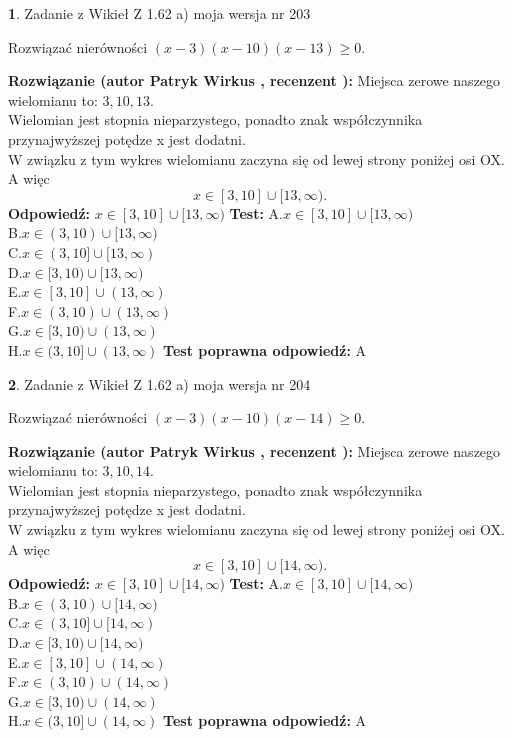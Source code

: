 \documentclass[12pt, a4paper]{article}
\theoremstyle{definition} %
\newtheorem{zad}{}
\newcommand{\zadStart}[1]{\begin{zad}#1\newline}
\newcommand{\zadStop}{\end{zad}}
\newcommand{\rozwStart}[2]{\noindent \textbf{Rozwiązanie (autor #1 , recenzent #2): }\newline}
\newcommand{\rozwStop}{\newline}
\newcommand{\odpStart}{\noindent \textbf{Odpowiedź:}\newline}
\newcommand{\odpStop}{\newline}
\newcommand{\testStart}{\noindent \textbf{Test:}\newline}
\newcommand{\testStop}{\newline}
\newcommand{\kluczStart}{\noindent \textbf{Test poprawna odpowiedź:}\newline}
\newcommand{\kluczStop}{\newline}
\begin{document}
\zadStart{Zadanie z Wikieł Z 1.62 a) moja wersja nr 203}

Rozwiązać nierówności $(x-3)(x-10)(x-13)\ge0$.
\zadStop
\rozwStart{Patryk Wirkus}{}
Miejsca zerowe naszego wielomianu to: $3, 10, 13$.\\
Wielomian jest stopnia nieparzystego, ponadto znak współczynnika przy\linebreak najwyższej potędze x jest dodatni.\\ W związku z tym wykres wielomianu zaczyna się od lewej strony poniżej osi OX. A więc $$x \in [3,10] \cup [13,\infty).$$
\rozwStop
\odpStart
$x \in [3,10] \cup [13,\infty)$
\odpStop
\testStart
A.$x \in [3,10] \cup [13,\infty)$\\
B.$x \in (3,10) \cup [13,\infty)$\\
C.$x \in (3,10] \cup [13,\infty)$\\
D.$x \in [3,10) \cup [13,\infty)$\\
E.$x \in [3,10] \cup (13,\infty)$\\
F.$x \in (3,10) \cup (13,\infty)$\\
G.$x \in [3,10) \cup (13,\infty)$\\
H.$x \in (3,10] \cup (13,\infty)$
\testStop
\kluczStart
A
\kluczStop



\zadStart{Zadanie z Wikieł Z 1.62 a) moja wersja nr 204}

Rozwiązać nierówności $(x-3)(x-10)(x-14)\ge0$.
\zadStop
\rozwStart{Patryk Wirkus}{}
Miejsca zerowe naszego wielomianu to: $3, 10, 14$.\\
Wielomian jest stopnia nieparzystego, ponadto znak współczynnika przy\linebreak najwyższej potędze x jest dodatni.\\ W związku z tym wykres wielomianu zaczyna się od lewej strony poniżej osi OX. A więc $$x \in [3,10] \cup [14,\infty).$$
\rozwStop
\odpStart
$x \in [3,10] \cup [14,\infty)$
\odpStop
\testStart
A.$x \in [3,10] \cup [14,\infty)$\\
B.$x \in (3,10) \cup [14,\infty)$\\
C.$x \in (3,10] \cup [14,\infty)$\\
D.$x \in [3,10) \cup [14,\infty)$\\
E.$x \in [3,10] \cup (14,\infty)$\\
F.$x \in (3,10) \cup (14,\infty)$\\
G.$x \in [3,10) \cup (14,\infty)$\\
H.$x \in (3,10] \cup (14,\infty)$
\testStop
\kluczStart
A
\kluczStop
\end{document}
